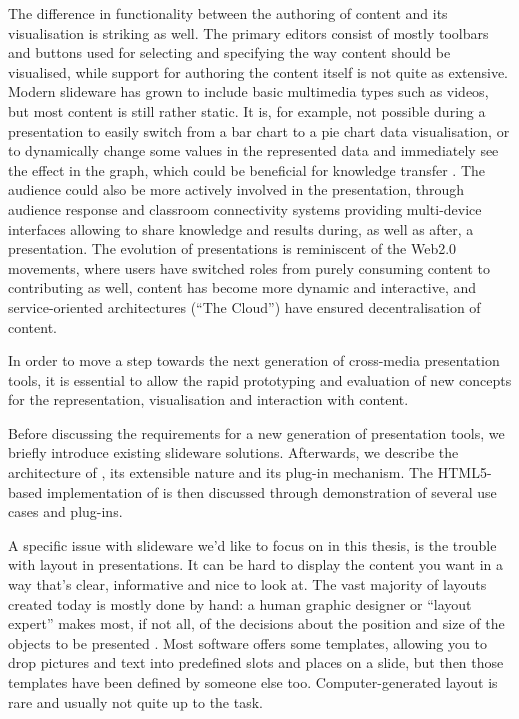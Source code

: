   The difference in functionality between the authoring of content and its
   visualisation is striking as well. The primary editors consist of mostly
   toolbars and buttons used for selecting and specifying the way content
   should be visualised, while support for authoring the content itself is not
   quite as extensive. Modern slideware has grown to include basic multimedia
   types such as videos, but most content is still rather static. It is, for
   example, not possible during a presentation to easily switch from a bar
   chart to a pie chart data visualisation, or to dynamically change some
   values in the represented data and immediately see the effect in the graph,
   which could be beneficial for knowledge transfer \citep{holzinger-1}. The
   audience could also be more actively involved in the presentation, through
   audience response and classroom connectivity systems providing multi-device
   interfaces allowing to share knowledge and results during, as well as after,
   a presentation. The evolution of presentations is reminiscent of the Web2.0
   movements, where users have switched roles from purely consuming content to
   contributing as well, content has become more dynamic and interactive, and
   service-oriented architectures (``The Cloud'') have ensured decentralisation
   of content.

   In order to move a step towards the next generation of cross-media
   presentation tools, it is essential to allow the rapid prototyping and
   evaluation of new concepts for the representation, visualisation and
   interaction with content.

   Before discussing the requirements for a new generation of presentation
   tools, we briefly introduce existing slideware solutions. Afterwards, we
   describe the architecture of \mxp, its extensible nature and its plug-in
   mechanism. The HTML5-based implementation of \mxp is then discussed through
   demonstration of several use cases and \mxp plug-ins.

   A specific issue with slideware we'd like to focus on in this thesis, is the
   trouble with layout in presentations. It can be hard to display the content
   you want in a way that's clear, informative and nice to look at. The vast
   majority of layouts created today is mostly done by hand: a human graphic
   designer or ``layout expert'' makes most, if not all, of the decisions about
   the position and size of the objects to be presented \citep{lok-1}. Most
   software offers some templates, allowing you to drop pictures and text into
   predefined slots and places on a slide, but then those templates have been
   defined by someone else too. Computer-generated layout is rare and usually
   not quite up to the task.

